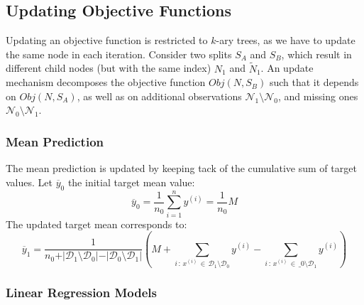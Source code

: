 \documentclass[a4paper, 11pt]{article}
\begin{document}
\subsection{Updating Objective Functions}

Updating an objective function is restricted to $k$-ary trees, as we have to update the same node in each iteration. Consider two splits $S_A$ and $S_B$, which result in different child nodes (but with the same index) $N_1$ and $\tilde{N}_1$. An update mechanism decomposes the objective function $Obj(N, S_B)$ such that it depends on $Obj(N, S_A)$, as well as on additional observations $\mathcal{N}_1 \setminus \mathcal{N}_0$, and missing ones $\mathcal{N}_0 \setminus \mathcal{N}_1$. 

\subsubsection{Mean Prediction}

The mean prediction is updated by keeping tack of the cumulative sum of target values. Let $\overline{y}_0$ the initial target mean value:
$$
\overline{y}_0 = \frac{1}{n_0} \sum_{i = 1}^n y^{(i)} = \frac{1}{n_0} M
$$
The updated target mean corresponds to:
$$
\overline{y}_1 =  \frac{1}{n_0 + \vert \mathcal{D}_1 \setminus \mathcal{D}_0 \vert - \vert \mathcal{D}_0 \setminus \mathcal{D}_1 \vert}\left(M + \sum_{i \,:\, x^{(i)} \, \in \, \mathcal{D}_1 \setminus \mathcal{D}_0} y^{(i)} - \sum_{i \,:\, x^{(i)} \, \in \, \_0 \setminus \mathcal{D}_1} y^{(i)} \right)
$$

\subsubsection{Linear Regression Models}
\end{document}
